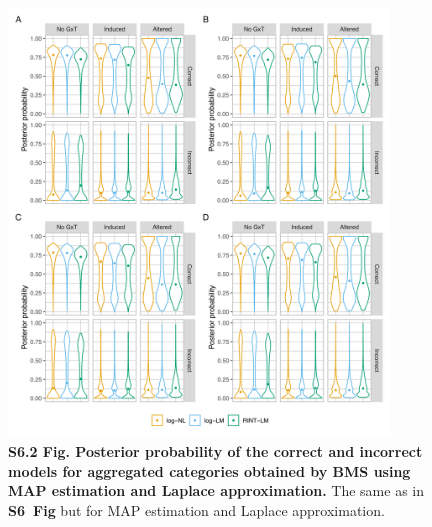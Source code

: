 \documentclass[11pt]{article}
\newcommand{\sfigppaggrmcmc}{\textbf{S6~Fig}\xspace}
\begin{document}
\begin{figure}[!ht]
\begin{center}
  \includegraphics[width=0.9\textwidth]{png/sim_vln_aggr_map_lap.png}
\end{center}  
\caption{
  {\bf
    S6.2 Fig.
    Posterior probability of the correct and incorrect models for aggregated categories obtained by BMS using MAP estimation and Laplace approximation.}
The same as in \sfigppaggrmcmc but for MAP estimation and Laplace approximation.
}
\label{s-fig:sim-vln-aggr-map}
\end{figure}
\end{document}
